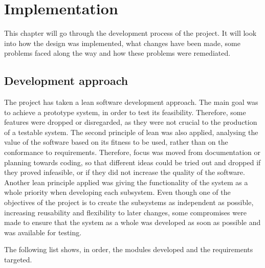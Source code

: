 \chapter{Implementation}
This chapter will go through the development process of the project. It will look into how the design was implemented, what changes have been made, some problems  faced along the way and how these problems were remediated.
\section{Development approach}
The project has taken a lean software development approach. The main goal was to achieve a prototype system, in order to test its feasibility. Therefore, some features were dropped or disregarded, as they were not crucial to the production of a testable system. The second principle of lean was also applied, analysing the value of the software based on its fitness to be used, rather than on the conformance to requirements. Therefore, focus was moved from documentation or planning towards coding, so that different ideas could be tried out and dropped if they proved infeasible, or if they did not increase the quality of the software. Another lean principle applied was giving the functionality of the system as a whole priority when developing each subsystem. Even though one of the objectives of the project is to create the subsystems as independent as possible, increasing reusability and flexibility to later changes, some compromises were made to ensure that the system as a whole was developed as soon as possible and was available for testing.

\noindent The following list shows, in order, the modules developed and the requirements targeted.

